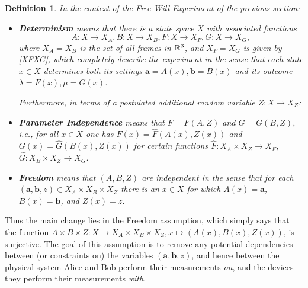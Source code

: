 \documentclass[11pt]{article}
\newtheorem{Definition}{Definition}[section]
\newcommand{\raw}{\rightarrow} \newcommand{\rat}{\mapsto}
\newcommand{\x}{\times} \newcommand{\hb}{\hbar}
\newcommand{\er}{\eqref}
\newcommand{\lm}{\lambda} \newcommand{\Lm}{\Lambda}
\newcommand{\ba}{\mathbf{a}}\newcommand{\bb}{\mathbf{b}}
\begin{document}
\begin{Definition}\label{FWTDEFS}
In the context of the Free Will Experiment of the previous section:
\begin{itemize}
\item 
\textbf{Determinism} means that there is a state space $X$  with associated functions $$A: X\raw X_A, B:X\raw X_B, F:X\raw X_F, G:X\raw X_G,$$ where $X_A=X_B$ is  the set of all frames in ${\mathbb R}^3$, and $X_F=X_G$ is given by \er{XFXG},
which completely describe the experiment in the sense that each state $x\in X$ determines both its settings $\ba=A(x),\bb=B(x)$ and its outcome $\lm=F(x),\mu=G(x)$. 

Furthermore, in terms of a postulated additional random variable $Z:X\raw X_Z$:
\item \textbf{Parameter Independence}  means that 
$F=F(A,Z)$ and $G=G(B,Z)$,
 i.e., for all $x\in X$ one has $F(x)=\hat{F}(A(x),Z(x))$ and $G(x)=\hat{G}(B(x),Z(x))$ for certain functions
  $\hat{F}:X_A \x X_Z\raw X_F$, $\hat{G}:X_B\x X_Z\raw X_G$.
\item \textbf{Freedom} means that
 $(A,B,Z)$ are independent in the sense that for each $(\ba,\bb,z)\in X_A\x X_B\x X_Z$ there is an $x\in X$  for which $A(x)=\ba$, $B(x)=\bb$, and $Z(x)=z$.
\end{itemize}
\end{Definition}
Thus the main change lies in the Freedom assumption, which simply says that the function $A\x B\x Z:X\raw X_A\x X_B\x X_Z, x\mapsto (A(x),B(x),Z(x))$, is surjective. The goal of this assumption is to remove any potential  dependencies between (or constraints on)  the variables  $(\ba,\bb,z)$, and hence between the physical system Alice and Bob perform their measurements \emph{on}, and the devices they perform their measurements \emph{with}.
\end{document}
